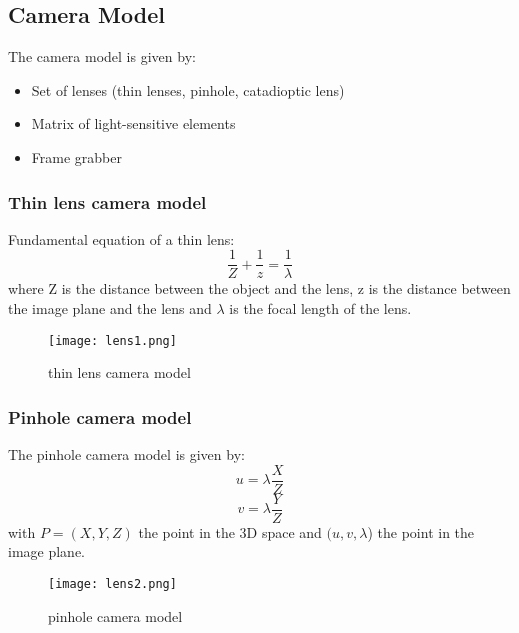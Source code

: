 \documentclass[a4paper,12pt]{article}
\begin{document}
\subsection{Camera Model}
The camera model is given by:
\begin{itemize}
\item Set of lenses (thin lenses, pinhole, catadioptic lens)
\item Matrix of light-sensitive elements
\item Frame grabber
\end{itemize}
\subsubsection{Thin lens camera model}
Fundamental equation of a thin lens:
\begin{equation}
\frac{1}{Z}+\frac{1}{z}=\frac{1}{\lambda}
\end{equation}
where Z is the distance between the object and the lens,
 z is the distance between the image plane and the lens and
    $\lambda$ is the focal length of the lens.\\
    \begin{figure}
        \centering
        \texttt{[image: lens1.png]}
        \caption{thin lens camera model}
        \label{fig:thin lens camera model}
    \end{figure}
\subsubsection{Pinhole camera model}
The pinhole camera model is given by:
\begin{equation}
    u=\lambda \frac{X}{Z}
\end{equation}
\begin{equation}
    v=\lambda \frac{Y}{Z}
\end{equation}
with $P=(X,Y,Z)$ the point in the 3D 
space and $(u, v, \lambda$) the point in the image plane.\\
\begin{figure}
    \centering
    \texttt{[image: lens2.png]}
    \caption{pinhole camera model}
    \label{fig:pinhole camera model}
\end{figure}
\end{document}
